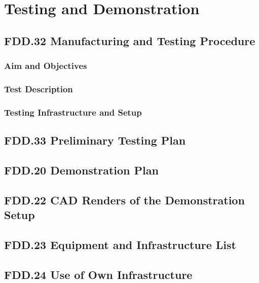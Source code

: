 \chapter{Testing and Demonstration}

\section{FDD.32 Manufacturing and Testing Procedure}
\subsection{Aim and Objectives}
\subsection{Test Description}
\subsection{Testing Infrastructure and Setup}

\section{FDD.33 Preliminary Testing Plan}

\section{FDD.20 Demonstration Plan}

\section{FDD.22 CAD Renders of the Demonstration Setup}

\section{FDD.23 Equipment and Infrastructure List}

\section{FDD.24 Use of Own Infrastructure}
